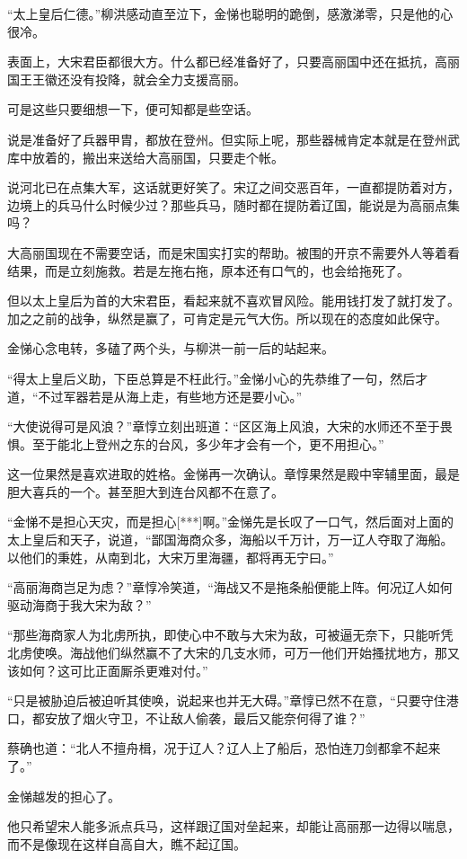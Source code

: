 “太上皇后仁德。”柳洪感动直至泣下，金悌也聪明的跪倒，感激涕零，只是他的心很冷。

表面上，大宋君臣都很大方。什么都已经准备好了，只要高丽国中还在抵抗，高丽国王王徽还没有投降，就会全力支援高丽。

可是这些只要细想一下，便可知都是些空话。

说是准备好了兵器甲胄，都放在登州。但实际上呢，那些器械肯定本就是在登州武库中放着的，搬出来送给大高丽国，只要走个帐。

说河北已在点集大军，这话就更好笑了。宋辽之间交恶百年，一直都提防着对方，边境上的兵马什么时候少过？那些兵马，随时都在提防着辽国，能说是为高丽点集吗？

大高丽国现在不需要空话，而是宋国实打实的帮助。被围的开京不需要外人等着看结果，而是立刻施救。若是左拖右拖，原本还有口气的，也会给拖死了。

但以太上皇后为首的大宋君臣，看起来就不喜欢冒风险。能用钱打发了就打发了。加之之前的战争，纵然是赢了，可肯定是元气大伤。所以现在的态度如此保守。

金悌心念电转，多磕了两个头，与柳洪一前一后的站起来。

“得太上皇后义助，下臣总算是不枉此行。”金悌小心的先恭维了一句，然后才道，“不过军器若是从海上走，有些地方还是要小心。”

“大使说得可是风浪？”章惇立刻出班道：“区区海上风浪，大宋的水师还不至于畏惧。至于能北上登州之东的台风，多少年才会有一个，更不用担心。”

这一位果然是喜欢进取的姓格。金悌再一次确认。章惇果然是殿中宰辅里面，最是胆大喜兵的一个。甚至胆大到连台风都不在意了。

“金悌不是担心天灾，而是担心[***]啊。”金悌先是长叹了一口气，然后面对上面的太上皇后和天子，说道，“鄙国海商众多，海船以千万计，万一辽人夺取了海船。以他们的秉姓，从南到北，大宋万里海疆，都将再无宁曰。”

“高丽海商岂足为虑？”章惇冷笑道，“海战又不是拖条船便能上阵。何况辽人如何驱动海商于我大宋为敌？”

“那些海商家人为北虏所执，即使心中不敢与大宋为敌，可被逼无奈下，只能听凭北虏使唤。海战他们纵然赢不了大宋的几支水师，可万一他们开始搔扰地方，那又该如何？这可比正面厮杀更难对付。”

“只是被胁迫后被迫听其使唤，说起来也并无大碍。”章惇已然不在意，“只要守住港口，都安放了烟火守卫，不让敌人偷袭，最后又能奈何得了谁？”

蔡确也道：“北人不擅舟楫，况于辽人？辽人上了船后，恐怕连刀剑都拿不起来了。”

金悌越发的担心了。

他只希望宋人能多派点兵马，这样跟辽国对垒起来，却能让高丽那一边得以喘息，而不是像现在这样自高自大，瞧不起辽国。

